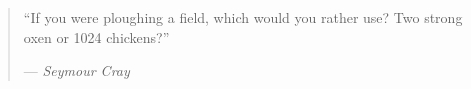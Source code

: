 %
\cleardoublepage
\thispagestyle{empty}

\begin{quote}
\noindent``If you were ploughing a field, which would you rather use? Two strong oxen or 1024 chickens?''
	
--- \emph{Seymour Cray}
\end{quote}

\clearemptydoublepage